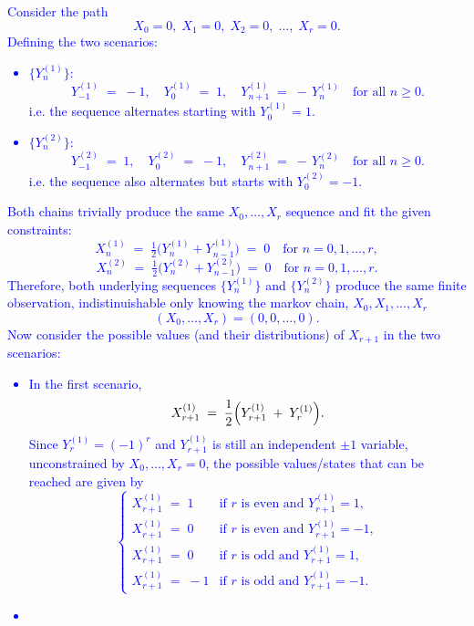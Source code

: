\documentclass{article}
\begin{document}
\begin{enumerate}
        \textcolor{blue}{
Consider the path
\[
  X_0 = 0,\; X_1 = 0,\; X_2 = 0,\;\dots,\; X_r = 0.
\]
Defining the two scenarios:
\begin{itemize}
\item 
  \(\{Y_n^{(1)}\}\): 
  \[
     Y_{-1}^{(1)} \;=\;-1,\quad
     Y_0^{(1)} \;=\; 1,\quad
     Y_{n+1}^{(1)} \;=\; -\,Y_n^{(1)}
     \quad\text{for all }n\ge 0.
  \]
  i.e. the sequence alternates starting with \(Y_0^{(1)}=1\).  
\item 
  \(\{Y^{(2)}_n\}\):
  \[
     Y^{(2)}_{-1} \;=\; 1,\quad
     Y^{(2)}_0 \;=\; -1,\quad
     Y^{(2)}_{n+1} \;=\; -\,Y^{(2)}_n
     \quad\text{for all }n\ge 0.
  \]
  i.e. the sequence also alternates but starts with \(Y^{(2)}_0 = -1\).
\end{itemize}
Both chains trivially produce the same \(X_0,\dots,X_r\) sequence and fit the given constraints:
\[
  X_n^{(1)} \;=\; \tfrac12\bigl(Y_n^{(1)} + Y_{n-1}^{(1)}\bigr) 
  \;=\; 0
  \quad\text{for } n=0,1,\dots,r,
\]
\[
  X^{(2)}_n
  \;=\;\tfrac12\bigl(Y^{(2)}_n + Y^{(2)}_{n-1}\bigr)
  \;=\; 0
  \quad\text{for } n=0,1,\dots,r.
\]
Therefore, both underlying sequences \(\{Y_n^{(1)}\}\) and \(\{Y^{(2)}_n\}\) produce the same finite observation, indistinuishable only knowing the markov chain, $X_0, X_1, ..., X_r$ 
\[
  (X_0,\dots,X_r) = (0,0,\dots,0).
\]
Now consider the possible values (and their distributions) of \(X_{r+1}\) in the two scenarios:
\begin{itemize}
\item 
  In the first scenario,
  \[
    X_{r+1}^{(1)}
    \;=\;\frac12\Bigl(Y_{r+1}^{(1)} \;+\; Y_r^{(1)}\Bigr).
  \]
  Since \(Y_r^{(1)}=(-1)^r\) and \(Y_{r+1}^{(1)}\) is still an independent \(\pm1\) variable, unconstrained by \(X_0,\dots,X_r=0\), the possible values/states that can be reached are given by 
  \[
    \begin{cases}
      X_{r+1}^{(1)} \;=\;1 
      & \text{if } r \text{ is even and } Y_{r+1}^{(1)}=1,\\[0.5em]
      X_{r+1}^{(1)} \;=\;0 
      & \text{if } r \text{ is even and } Y_{r+1}^{(1)}=-1,\\[0.5em]
      X_{r+1}^{(1)} \;=\;0 
      & \text{if } r \text{ is odd and } Y_{r+1}^{(1)}=1,\\[0.5em]
      X_{r+1}^{(1)} \;=\;-1
      & \text{if } r \text{ is odd and } Y_{r+1}^{(1)}=-1.
    \end{cases}
  \]
\item

\end{itemize}}
\end{enumerate}
\end{document}
